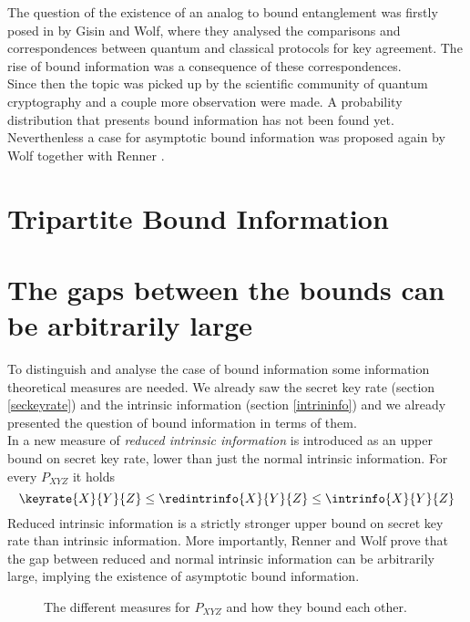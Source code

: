 The question of the existence of an analog to bound entanglement was firstly posed in \cite{GisWolf00} by Gisin and Wolf, where they analysed the comparisons and correspondences between quantum and classical protocols for key agreement. 
The rise of bound information was a consequence of these correspondences.\\
Since then the topic was picked up by the scientific community of quantum cryptography and a couple more observation were made.
A probability distribution that presents bound information has not been found yet. Neverthenless 	a case for asymptotic bound information was proposed again by Wolf together with Renner \cite{RW03}.

\section{Tripartite Bound Information}
\section{The gaps between the bounds can be arbitrarily large}
    To distinguish and analyse the case of bound information some information theoretical measures are needed. 
    We already saw the secret key rate (section \ref{seckeyrate}) and the intrinsic information (section \ref{intrininfo}) and we already presented the question of bound information in terms of them. \\
    In \cite{RW03} a new measure of \emph{reduced intrinsic information} is introduced as an upper bound on secret key rate, lower than just the normal intrinsic information.
    For every $P_{XYZ}$ it holds
    \begin{equation}
    	\keyrate{X}{Y}{Z} \leq \redintrinfo{X}{Y}{Z} \leq \intrinfo{X}{Y}{Z}
    \end{equation}
    	Reduced intrinsic information is a strictly stronger upper bound on secret key rate than intrinsic information.
    	More importantly, Renner and Wolf prove that the gap between reduced and normal intrinsic information can be arbitrarily large, implying the existence of asymptotic bound information.
    	\begin{figure}
    		
    		\caption{The different measures for $P_{XYZ}$ and how they bound each other.}
    	\end{figure}
